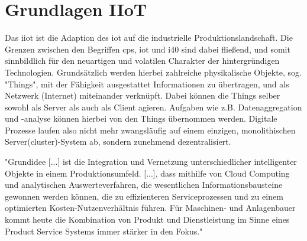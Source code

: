 \section{Grundlagen IIoT}\label{sec:iiot}
Das \ac{iiot} ist die Adaption des \ac{iot} auf die industrielle Produktionslandschaft. Die Grenzen zwischen den Begriffen \ac{cps}, \ac{iot} und \ac{i40} sind dabei fließend, und somit sinnbildlich für den neuartigen und volatilen Charakter der hintergründigen Technologien.
Grundsätzlich werden hierbei zahlreiche physikalische Objekte, sog. "Things", mit der Fähigkeit ausgestattet Informationen zu übertragen, und als Netzwerk (Internet) miteinander verknüpft. Dabei können die Things selber sowohl als Server als auch als Client agieren. Aufgaben wie z.B. Datenaggregation und -analyse können hierbei von den Things übernommen werden. Digitale Prozesse laufen also nicht mehr zwangsläufig  auf einem einzigen, monolithischen Server(cluster)-System ab, sondern zunehmend dezentralisiert.

"Grundidee [...] ist die Integration und
Vernetzung unterschiedlicher intelligenter Objekte in einem Produktionsumfeld. [...], dass mithilfe von Cloud Computing und analytischen
Auswerteverfahren, die wesentlichen Informationsbausteine
gewonnen werden können, die zu
effizienteren Serviceprozessen und zu einem optimierten
Kosten-Nutzenverhältnis führen. Für
Maschinen- und Anlagenbauer kommt heute die
Kombination von Produkt und Dienstleistung
im Sinne eines Product Service Systems immer
stärker in den Fokus." \cite{i40_instandhaltung}

